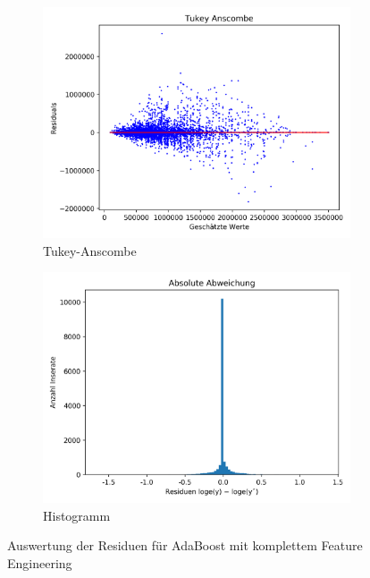 \begin{figure}[h]
\begin{subfigure}{.5\textwidth}
  \centering
  \includegraphics[width=\linewidth]{images/adaboost_tukey_anscombe_8.png}
  \caption[Tukey-Anscombe]{Tukey-Anscombe}
  \label{fig:ada_tukey-anscombe_8}
\end{subfigure}
\begin{subfigure}{.5\textwidth}
  \centering
  \includegraphics[width=\linewidth]{images/adaboost_verteilung_residuals_log_8.png}
  \caption[Histogramm]{Histogramm}
  \label{fig:ada_histo_8}
\end{subfigure}
\caption[Auswertung der Residuen für AdaBoost mit komplettem Feature Engineering]{Auswertung der Residuen für AdaBoost mit komplettem Feature Engineering}
\label{fig:adaboost_8}
\end{figure}

